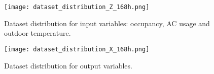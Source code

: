 \begin{figure}
    \centering
    \texttt{[image: dataset\_distribution\_Z\_168h.png]}
    \caption{Dataset distribution for input variables: occupancy, AC usage and outdoor temperature.}
    \label{fig:dataset_distribution_Z}
\end{figure}

\begin{figure}
    \centering
    \texttt{[image: dataset\_distribution\_X\_168h.png]}
    \caption{Dataset distribution for output variables.}
    \label{fig:dataset_distribution_X}
\end{figure}